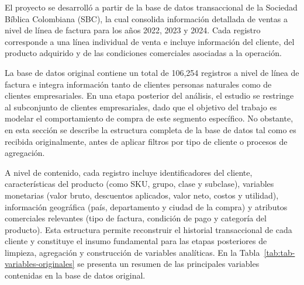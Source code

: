 El proyecto se desarrolló a partir de la base de datos transaccional de la Sociedad Bíblica Colombiana (SBC), la cual consolida información detallada de ventas a nivel de línea de factura para los años 2022, 2023 y 2024. Cada registro corresponde a una línea individual de venta e incluye información del cliente, del producto adquirido y de las condiciones comerciales asociadas a la operación.

La base de datos original contiene un total de 106{,}254 registros a nivel de línea de factura e integra información tanto de clientes personas naturales como de clientes empresariales. En una etapa posterior del análisis, el estudio se restringe al subconjunto de clientes empresariales, dado que el objetivo del trabajo es modelar el comportamiento de compra de este segmento específico. No obstante, en esta sección se describe la estructura completa de la base de datos tal como es recibida originalmente, antes de aplicar filtros por tipo de cliente o procesos de agregación.

A nivel de contenido, cada registro incluye identificadores del cliente, características del producto (como SKU, grupo, clase y subclase), variables monetarias (valor bruto, descuentos aplicados, valor neto, costos y utilidad), información geográfica (país, departamento y ciudad de la compra) y atributos comerciales relevantes (tipo de factura, condición de pago y categoría del producto). Esta estructura permite reconstruir el historial transaccional de cada cliente y constituye el insumo fundamental para las etapas posteriores de limpieza, agregación y construcción de variables analíticas.
En la Tabla~\ref{tab:tab-variables-originales} se presenta un resumen de las principales variables contenidas en la base de datos original. 


